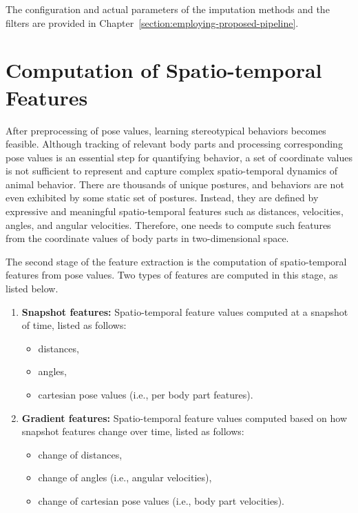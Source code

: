 The configuration and actual parameters of the imputation methods and the filters are provided in Chapter~\ref{section:employing-proposed-pipeline}.

\section{Computation of Spatio-temporal Features}\label{section:spatiotemporal-fetaures}
After preprocessing of pose values, learning stereotypical behaviors becomes feasible.
Although tracking of relevant body parts and processing corresponding pose values is an essential step for quantifying behavior, a set of coordinate values is not sufficient to represent and capture complex spatio-temporal dynamics of animal behavior.
There are thousands of unique postures, and behaviors are not even exhibited by some static set of postures.
Instead, they are defined by expressive and meaningful spatio-temporal features such as distances, velocities, angles, and angular velocities.
Therefore, one needs to compute such features from the coordinate values of body parts in two-dimensional space.

The second stage of the feature extraction is the computation of spatio-temporal features from pose values. Two types of features are computed in this stage, as listed below.
\begin{enumerate}
	\item \textbf{Snapshot features:} Spatio-temporal feature values computed at a snapshot of time, listed as follows:
	      \begin{itemize}
		      \item distances,
		      \item angles,
		      \item cartesian pose values (i.e., per body part features).
	      \end{itemize}
	\item \textbf{Gradient features:} Spatio-temporal feature values computed based on how snapshot features change over time, listed as follows:
	      \begin{itemize}
		      \item change of distances,
		      \item change of angles (i.e., angular velocities),
		      \item change of cartesian pose values (i.e., body part velocities).
	      \end{itemize}
\end{enumerate}

